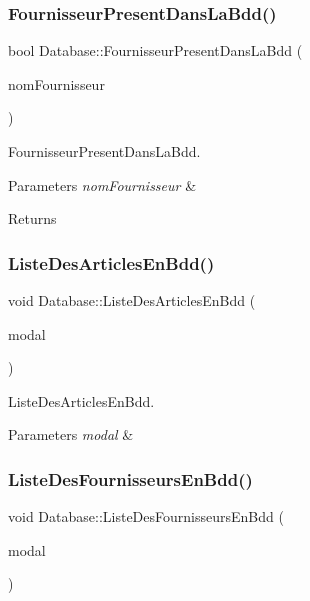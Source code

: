 \subsubsection{\texorpdfstring{Fournisseur\+Present\+Dans\+La\+Bdd()}{FournisseurPresentDansLaBdd()}}
{\footnotesize\ttfamily bool Database\+::\+Fournisseur\+Present\+Dans\+La\+Bdd (\begin{DoxyParamCaption}\item[{Q\+String}]{nom\+Fournisseur }\end{DoxyParamCaption})}



Fournisseur\+Present\+Dans\+La\+Bdd. 


\begin{DoxyParams}{Parameters}
{\em nom\+Fournisseur} & \\
\hline
\end{DoxyParams}
\begin{DoxyReturn}{Returns}

\end{DoxyReturn}
\mbox{\label{class_database_ab2c30b7afdf7bfd699a142739c66e447}} 
\subsubsection{\texorpdfstring{Liste\+Des\+Articles\+En\+Bdd()}{ListeDesArticlesEnBdd()}}
{\footnotesize\ttfamily void Database\+::\+Liste\+Des\+Articles\+En\+Bdd (\begin{DoxyParamCaption}\item[{Q\+Sql\+Query\+Model $\ast$}]{modal }\end{DoxyParamCaption})}



Liste\+Des\+Articles\+En\+Bdd. 


\begin{DoxyParams}{Parameters}
{\em modal} & \\
\hline
\end{DoxyParams}
\mbox{\label{class_database_addce242de8b2dd4ad9c4f2cde7e8da0a}} 
\subsubsection{\texorpdfstring{Liste\+Des\+Fournisseurs\+En\+Bdd()}{ListeDesFournisseursEnBdd()}}
{\footnotesize\ttfamily void Database\+::\+Liste\+Des\+Fournisseurs\+En\+Bdd (\begin{DoxyParamCaption}\item[{Q\+Sql\+Query\+Model $\ast$}]{modal }\end{DoxyParamCaption})}



